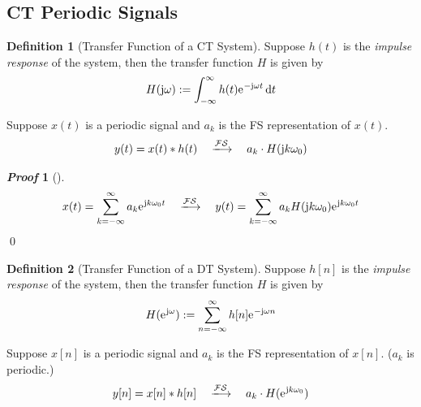 \documentclass[10pt,UTF8]{article}
\newenvironment{definition box}
{\begin{tcolorbox}[colback=blue!5!white,colframe=blue!75!black,parbox=false,before upper=\par,before lower=\par]}
{\end{tcolorbox}}
\newenvironment{theorem box}
{\begin{tcolorbox}[colback=yellow!5!white,colframe=yellow!75!black,parbox=false,before upper=\par,before lower=\par]}
{\end{tcolorbox}}
\theoremstyle{definition}
\newtheorem{definition inner}{Definition}[section]
\newenvironment{definition}[1][]
{\begin{definition box}\begin{definition inner}[#1]\hfill\par}
{\end{definition inner}\end{definition box}}
\theoremstyle{plain}
\newtheorem{theorem inner}{Theorem}[section]
\theoremstyle{definition}
\newtheorem*{proof inner}{\textit{Proof}}
\renewenvironment{proof}[1][]
{\begin{proof inner}[#1]\hfill\par}
{\qed\end{proof inner}}
\theoremstyle{remark}
\newcommand{\ju}{\mathrm{j}}  %
\newcommand{\e}{\mathrm{e}{\mkern 1 mu}}
\begin{document}
\subsection{CT Periodic Signals}
\begin{definition}[Transfer Function of a CT System]
    Suppose $h(t)$ is the \emph{impulse response} of the system,
    then the transfer function $H$ is given by
    \begin{equation*}
        H(\ju\omega) := \int_{-\infty}^{\infty} h(t) \e^{-\ju\omega t} \dd{t}
    \end{equation*}
\end{definition}

\begin{theorem box}
    Suppose $x(t)$ is a periodic signal and
    $a_k$ is the FS representation of $x(t)$.
    \begin{gather*}
        y(t) = x(t) \ast h(t)
        \quad\xlongrightarrow{\mathcal{FS}}\quad
        a_k\cdot H(\ju k\omega_0)
    \end{gather*}
\end{theorem box}
\begin{proof}
    \begin{gather*}
        x(t) = \sum_{k=-\infty}^{\infty} a_k \e^{\ju k \omega_0 t}
        \quad\xlongrightarrow{\mathcal{FS}}\quad
        y(t) = \sum_{k=-\infty}^{\infty} a_k H(\ju k\omega_0)\e^{\ju k \omega_0 t}
    \end{gather*}
\end{proof}

\begin{definition}[Transfer Function of a DT System]
    Suppose $h[n]$ is the \emph{impulse response} of the system,
    then the transfer function $H$ is given by
    \begin{equation*}
        H(\e^{\ju\omega}) := \sum_{n=-\infty}^{\infty} h[n] \e^{-\ju\omega n}
    \end{equation*}
\end{definition}

\begin{theorem box}
    Suppose $x[n]$ is a periodic signal and
    $a_k$ is the FS representation of $x[n]$.
    ($a_k$ is periodic.)
    \begin{gather*}
        y[n] = x[n] \ast h[n]
        \quad\xlongrightarrow{\mathcal{FS}}\quad
        a_k\cdot H(\e^{\ju k\omega_0})
    \end{gather*}
\end{theorem box}
\end{document}
